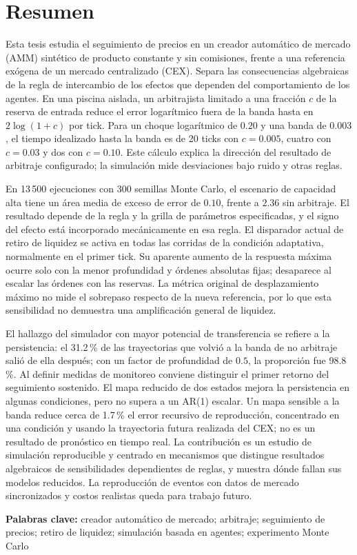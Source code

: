 \section{Resumen}

Esta tesis estudia el seguimiento de precios en un creador automático de mercado (AMM) sintético de producto constante y sin comisiones, frente a una referencia exógena de un mercado centralizado (CEX). Separa las consecuencias algebraicas de la regla de intercambio de los efectos que dependen del comportamiento de los agentes. En una piscina aislada, un arbitrajista limitado a una fracción $c$ de la reserva de entrada reduce el error logarítmico fuera de la banda hasta en $2\log(1+c)$ por tick. Para un choque logarítmico de $0.20$ y una banda de $0.003$, el tiempo idealizado hasta la banda es de 20 ticks con $c=0.005$, cuatro con $c=0.03$ y dos con $c=0.10$. Este cálculo explica la dirección del resultado de arbitraje configurado; la simulación mide desviaciones bajo ruido y otras reglas.

En 13\,500 ejecuciones con 300 semillas Monte Carlo, el escenario de capacidad alta tiene un área media de exceso de error de $0.10$, frente a $2.36$ sin arbitraje. El resultado depende de la regla y la grilla de parámetros especificadas, y el signo del efecto está incorporado mecánicamente en esa regla. El disparador actual de retiro de liquidez se activa en todas las corridas de la condición adaptativa, normalmente en el primer tick. Su aparente aumento de la respuesta máxima ocurre solo con la menor profundidad y órdenes absolutas fijas; desaparece al escalar las órdenes con las reservas. La métrica original de desplazamiento máximo no mide el sobrepaso respecto de la nueva referencia, por lo que esta sensibilidad no demuestra una amplificación general de liquidez.

El hallazgo del simulador con mayor potencial de transferencia se refiere a la persistencia: el 31.2\,\% de las trayectorias que volvió a la banda de no arbitraje salió de ella después; con un factor de profundidad de $0.5$, la proporción fue 98.8\,\%. Al definir medidas de monitoreo conviene distinguir el primer retorno del seguimiento sostenido. El mapa reducido de dos estados mejora la persistencia en algunas condiciones, pero no supera a un AR(1) escalar. Un mapa sensible a la banda reduce cerca de 1.7\,\% el error recursivo de reproducción, concentrado en una condición y usando la trayectoria futura realizada del CEX; no es un resultado de pronóstico en tiempo real. La contribución es un estudio de simulación reproducible y centrado en mecanismos que distingue resultados algebraicos de sensibilidades dependientes de reglas, y muestra dónde fallan sus modelos reducidos. La reproducción de eventos con datos de mercado sincronizados y costos realistas queda para trabajo futuro.

\textbf{Palabras clave:} creador automático de mercado; arbitraje; seguimiento de precios; retiro de liquidez; simulación basada en agentes; experimento Monte Carlo
